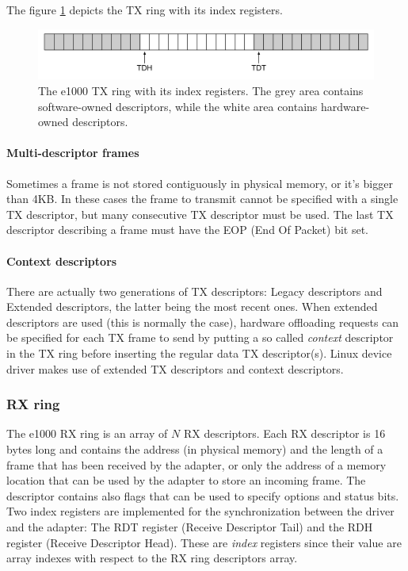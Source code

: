The figure \ref{fig:txring} depicts the TX ring with its index registers.

\begin{figure}[bt]
\centering
\includegraphics[scale = 0.35]{tx-ring.pdf}
\caption{The e1000 TX ring with its index registers. The grey area contains software-owned descriptors, while the white area
	contains hardware-owned descriptors.}
\label{fig:txring}
\end{figure}

\paragraph{Multi-descriptor frames}
Sometimes a frame is not stored contiguously in physical memory, or it's bigger than 4KB. In these cases the frame to transmit cannot
be specified with a single TX descriptor, but many consecutive TX descriptor must be used. The last TX descriptor describing a frame
must have the EOP (End Of Packet) bit set.

\paragraph{Context descriptors}
There are actually two generations of TX descriptors: Legacy descriptors and Extended descriptors, the latter being the most
recent ones.
When extended descriptors are used (this is normally the case), hardware offloading requests can be specified for each TX frame to send
by putting a so called \emph{context} descriptor in the TX ring before inserting the regular data TX descriptor(s).
Linux device driver makes use of extended TX descriptors and context descriptors.


\subsubsection{RX ring}
\label{sec:rxring}
The e1000 RX ring is an array of $N$ RX descriptors. Each RX descriptor is 16 bytes long and contains the address (in physical 
memory) and the length of a frame that has been received by the adapter, or only the address of a memory location that can be
used by the adapter to store an incoming frame. The descriptor contains also flags that can be used to specify options and status bits.
Two index registers are implemented for the synchronization between the driver and the adapter:
The RDT register (Receive Descriptor Tail) and the RDH register (Receive Descriptor Head). These are \emph{index} registers since
their value are array indexes with respect to the RX ring descriptors array.

